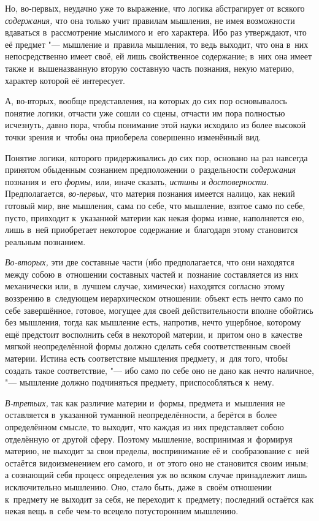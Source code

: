 Но, во-первых, неудачно уже то выражение, что логика абстрагирует от всякого
{\em содержания,} что она только учит правилам
мышления, не имея возможности вдаваться в~рассмотрение мыслимого и~его
характера. Ибо раз утверждают, что её предмет "--- мышление и~правила
мышления, то ведь выходит, что она в~них непосредственно имеет своё, ей
лишь свойственное содержание; в~них она имеет также и~вышеназванную вторую
составную часть познания, некую материю, характер которой её интересует.

А, во-вторых, вообще представления, на которых до сих пор
основывалось понятие логики, отчасти уже сошли со сцены, отчасти им
пора полностью исчезнуть, давно пора, чтобы понимание этой науки
исходило из более высокой точки зрения и~чтобы она приоберела совершенно
изменённый вид.

Понятие логики, которого придерживались до сих пор, основано на раз навсегда
принятом обыденным сознанием предположении о~раздельности {\em содержания}
познания и~его {\em формы,} или, иначе сказать, {\em истины} и
{\em достоверности}. Предполагается, {\em во-первых,} что материя познания
имеется налицо, как некий готовый мир, вне мышления, сама по себе, что
мышление, взятое само по себе, пусто, привходит к~указанной материи как
некая форма извне, наполняется ею, лишь в~ней приобретает некоторое
содержание и~благодаря этому становится реальным познанием.

{\em Во-вторых,} эти две составные части (ибо
предполагается, что они находятся между собою в~отношении составных частей
и~познание составляется из них механически или, в~лучшем случае, химически)
находятся согласно этому воззрению в~следующем иерархическом отношении:
объект есть нечто само по себе завершённое, готовое, могущее для своей
действительности вполне обойтись без мышления, тогда как мышление есть,
напротив, нечто ущербное, которому ещё предстоит восполнить себя в
некоторой материи, и~притом оно в~качестве мягкой неопределённой формы
должно сделать себя соответственным своей материи. Истина есть соответствие
мышления предмету, и~для того, чтобы создать такое соответствие, "--- ибо само
по себе оно не дано как нечто наличное, "--- мышление должно подчиняться
предмету, приспособляться к~нему.

{\em В-третьих,} так как различие материи и~формы,
предмета и~мышления не оставляется в~указанной туманной неопределённости, а
берётся в~более определённом смысле, то выходит, что каждая из них
представляет собою отделённую от другой сферу. Поэтому мышление,
воспринимая и~формируя материю, не выходит за свои пределы, воспринимание
её и~сообразование с~ней остаётся видоизменением его самого,
и~от этого оно не становится своим иным; а
сознающий себя процесс определения уж во всяком случае принадлежит лишь
исключительно мышлению. Оно, стало быть, даже в~своём отношении к~предмету не
выходит за себя, не переходит к~предмету; последний остаётся как некая вещь в~себе
чем-то всецело потусторонним мышлению.

